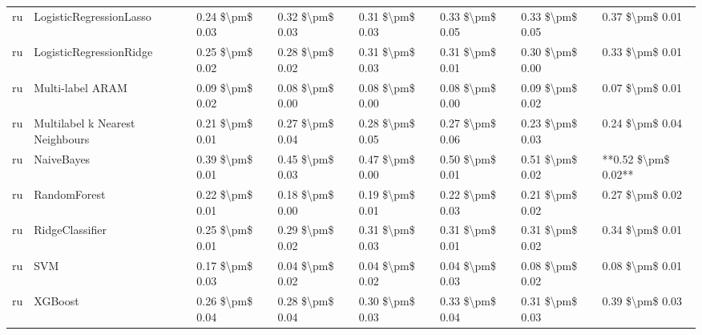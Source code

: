 \begin{tabular}{llllllll}
      ru &         LogisticRegressionLasso & 0.24 \$\textbackslash pm\$ 0.03 &           0.32 \$\textbackslash pm\$ 0.03 &       0.31 \$\textbackslash pm\$ 0.03 &        0.33 \$\textbackslash pm\$ 0.05 &                         0.33 \$\textbackslash pm\$ 0.05 &     0.37 \$\textbackslash pm\$ 0.01 \\
      ru &         LogisticRegressionRidge & 0.25 \$\textbackslash pm\$ 0.02 &           0.28 \$\textbackslash pm\$ 0.02 &       0.31 \$\textbackslash pm\$ 0.03 &        0.31 \$\textbackslash pm\$ 0.01 &                         0.30 \$\textbackslash pm\$ 0.00 &     0.33 \$\textbackslash pm\$ 0.01 \\
      ru &                Multi-label ARAM & 0.09 \$\textbackslash pm\$ 0.02 &           0.08 \$\textbackslash pm\$ 0.00 &       0.08 \$\textbackslash pm\$ 0.00 &        0.08 \$\textbackslash pm\$ 0.00 &                         0.09 \$\textbackslash pm\$ 0.02 &     0.07 \$\textbackslash pm\$ 0.01 \\
      ru & Multilabel k Nearest Neighbours & 0.21 \$\textbackslash pm\$ 0.01 &           0.27 \$\textbackslash pm\$ 0.04 &       0.28 \$\textbackslash pm\$ 0.05 &        0.27 \$\textbackslash pm\$ 0.06 &                         0.23 \$\textbackslash pm\$ 0.03 &     0.24 \$\textbackslash pm\$ 0.04 \\
      ru &                      NaiveBayes & 0.39 \$\textbackslash pm\$ 0.01 &           0.45 \$\textbackslash pm\$ 0.03 &       0.47 \$\textbackslash pm\$ 0.00 &        0.50 \$\textbackslash pm\$ 0.01 &                         0.51 \$\textbackslash pm\$ 0.02 & **0.52 \$\textbackslash pm\$ 0.02** \\
      ru &                    RandomForest & 0.22 \$\textbackslash pm\$ 0.01 &           0.18 \$\textbackslash pm\$ 0.00 &       0.19 \$\textbackslash pm\$ 0.01 &        0.22 \$\textbackslash pm\$ 0.03 &                         0.21 \$\textbackslash pm\$ 0.02 &     0.27 \$\textbackslash pm\$ 0.02 \\
      ru &                 RidgeClassifier & 0.25 \$\textbackslash pm\$ 0.01 &           0.29 \$\textbackslash pm\$ 0.02 &       0.31 \$\textbackslash pm\$ 0.03 &        0.31 \$\textbackslash pm\$ 0.01 &                         0.31 \$\textbackslash pm\$ 0.02 &     0.34 \$\textbackslash pm\$ 0.01 \\
      ru &                             SVM & 0.17 \$\textbackslash pm\$ 0.03 &           0.04 \$\textbackslash pm\$ 0.02 &       0.04 \$\textbackslash pm\$ 0.02 &        0.04 \$\textbackslash pm\$ 0.03 &                         0.08 \$\textbackslash pm\$ 0.02 &     0.08 \$\textbackslash pm\$ 0.01 \\
      ru &                         XGBoost & 0.26 \$\textbackslash pm\$ 0.04 &           0.28 \$\textbackslash pm\$ 0.04 &       0.30 \$\textbackslash pm\$ 0.03 &        0.33 \$\textbackslash pm\$ 0.04 &                         0.31 \$\textbackslash pm\$ 0.03 &     0.39 \$\textbackslash pm\$ 0.03 \\
\bottomrule
\end{tabular}
